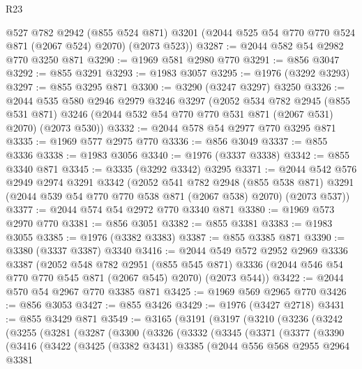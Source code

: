 \begin{lexlean}{R23}
\begin{coremodule}
      @527
      @782
      @2942
      (@855 @524 @871)
      @3201
      (@2044 @525 @54 @770 @770 @524 @871 (@2067 @524) @2070)
      (@2073 @523))
@3287 := @2044 @582 @54 @2982 @770 @3250 @871
@3290 := @1969 @581 @2980 @770
@3291 := @856 @3047
@3292 := @855 @3291
@3293 := @1983 @3057
@3295 := @1976 (@3292 @3293)
@3297 := @855 @3295 @871
@3300 := @3290 (@3247 @3297) @3250
@3326 := @2044
    @535
    @580
    @2946
    @2979
    @3246
    @3297
    (@2052
      @534
      @782
      @2945
      (@855 @531 @871)
      @3246
      (@2044 @532 @54 @770 @770 @531 @871 (@2067 @531) @2070)
      (@2073 @530))
@3332 := @2044 @578 @54 @2977 @770 @3295 @871
@3335 := @1969 @577 @2975 @770
@3336 := @856 @3049
@3337 := @855 @3336
@3338 := @1983 @3056
@3340 := @1976 (@3337 @3338)
@3342 := @855 @3340 @871
@3345 := @3335 (@3292 @3342) @3295
@3371 := @2044
    @542
    @576
    @2949
    @2974
    @3291
    @3342
    (@2052
      @541
      @782
      @2948
      (@855 @538 @871)
      @3291
      (@2044 @539 @54 @770 @770 @538 @871 (@2067 @538) @2070)
      (@2073 @537))
@3377 := @2044 @574 @54 @2972 @770 @3340 @871
@3380 := @1969 @573 @2970 @770
@3381 := @856 @3051
@3382 := @855 @3381
@3383 := @1983 @3055
@3385 := @1976 (@3382 @3383)
@3387 := @855 @3385 @871
@3390 := @3380 (@3337 @3387) @3340
@3416 := @2044
    @549
    @572
    @2952
    @2969
    @3336
    @3387
    (@2052
      @548
      @782
      @2951
      (@855 @545 @871)
      @3336
      (@2044 @546 @54 @770 @770 @545 @871 (@2067 @545) @2070)
      (@2073 @544))
@3422 := @2044 @570 @54 @2967 @770 @3385 @871
@3425 := @1969 @569 @2965 @770
@3426 := @856 @3053
@3427 := @855 @3426
@3429 := @1976 (@3427 @2718)
@3431 := @855 @3429 @871
@3549 := @3165
    (@3191
      (@3197
        (@3210
          (@3236
            (@3242
              (@3255
                (@3281
                  (@3287
                    (@3300
                      (@3326
                        (@3332
                          (@3345
                            (@3371
                              (@3377
                                (@3390
                                  (@3416
                                    (@3422
                                      (@3425
                                        (@3382 @3431)
                                        @3385
                                        (@2044
                                          @556
                                          @568
                                          @2955
                                          @2964
                                          @3381

\end{coremodule}
\end{lexlean}
